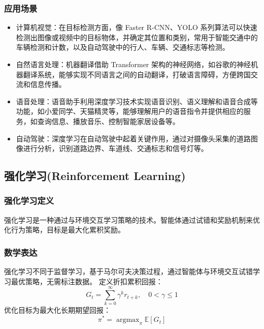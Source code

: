 \documentclass[12pt]{article}
\begin{document}
\subsubsection{应用场景}
\begin{itemize}
    \item 计算机视觉：在目标检测方面，像 Faster R-CNN、YOLO 系列算法可以快速检测出图像或视频中的目标物体，并确定其位置和类别，常用于智能交通中的车辆检测和计数，以及自动驾驶中的行人、车辆、交通标志等检测。

    \item 自然语言处理：机器翻译借助 Transformer 架构的神经网络，如谷歌的神经机器翻译系统，能够实现不同语言之间的自动翻译，打破语言障碍，方便跨国交流和信息传播。

    \item 语音处理：语音助手利用深度学习技术实现语音识别、语义理解和语音合成等功能，如小爱同学、天猫精灵等，能够理解用户的语音指令并提供相应的服务，如查询信息、播放音乐、控制智能家居设备等。

    \item 自动驾驶：深度学习在自动驾驶中起着关键作用，通过对摄像头采集的道路图像进行分析，识别道路边界、车道线、交通标志和信号灯等。

\end{itemize}

\subsection{强化学习(Reinforcement Learning)}
\subsubsection{强化学习定义}
强化学习是一种通过与环境交互学习策略的技术。智能体通过试错和奖励机制来优化行为策略，目标是最大化累积奖励。

\subsubsection{数学表达}
强化学习不同于监督学习，基于马尔可夫决策过程，通过智能体与环境交互试错学习最优策略，无需标注数据。
定义折扣累积回报：
\[
G_t=\sum_{k=0}^{\infty}\gamma^k r_{t+k},\quad 0<\gamma\le1
\]
优化目标为最大化长期期望回报：
\[
\pi^*=\mathop{\arg\max}_{\pi}\mathbb{E}[G_t]
\]
\end{document}
